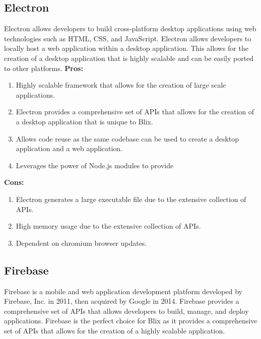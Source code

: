 \documentclass[11pt,a4paper]{article}
\begin{document}
\subsection{Electron}

Electron allows developers to build cross-platform desktop applications using
web technologies such as HTML, CSS, and JavaScript. Electron allows developers
to locally host a web application within a desktop application. This allows for
the creation of a desktop application that is highly scalable and can be easily
ported to other platforms.
\textbf{Pros:}

\begin{enumerate}[label*=\arabic*.]
	\item[\textbullet] Highly scalable framework that allows for the creation of
	large scale applications.
	\item[\textbullet] Electron provides a comprehensive set of APIs that allows
	for the creation of a desktop application that is unique to Blix.
	\item[\textbullet] Allows code reuse as the same codebase can be used to
	create a desktop application and a web application.
	\item[\textbullet] Leverages the power of Node.js modules to provide 
\end{enumerate}
\pagebreak
\textbf{Cons:}

\begin{enumerate}[label*=\arabic*.]
	\item[\textbullet] Electron generates a large executable file due to the
	extensive collection of APIs.
	\item[\textbullet] High memory usage due to the extensive collection of
	APIs.
	\item[\textbullet] Dependent on chromium browser updates.
\end{enumerate}


\subsection{Firebase}

Firebase is a mobile and web application development platform developed by
Firebase, Inc. in 2011, then acquired by Google in 2014. Firebase provides a
comprehensive set of APIs that allows developers to build, manage, and deploy
applications. Firebase is the perfect choice for Blix as it provides a
comprehensive set of APIs that allows for the creation of a highly scalable
application.
\end{document}
